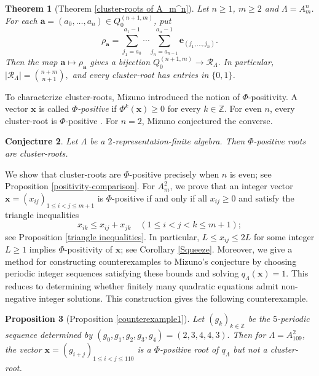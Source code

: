 \documentclass[11pt,a4paper]{amsart}
\newtheorem{theorem}{Theorem}[section]
\newtheorem{proposition}[theorem]{Proposition}
\newtheorem{conjecture}[theorem]{Conjecture}
\theoremstyle{definition}
\numberwithin{equation}{section}
\newcommand{\Z}{\mathbb{Z}}
\newcommand{\e}{\mathbf{e}}
\newcommand{\x}{\mathbf{x}}
\newcommand{\0}{\mathbf{0}}
\begin{document}
	\begin{theorem} [Theorem \ref{cluster-roots of A_m^n}] \label{thm2}
		Let $n\ge1$, $m\ge 2$ and $\Lambda=A_m^n$.
		For each $\mathbf a=(a_0,\ldots,a_n)\in Q_0^{(n+1,m)}$, put
		\[
		\rho_{\mathbf a}
		=
		\sum_{j_1=a_0}^{a_1-1}\cdots
		\sum_{j_n=a_{n-1}}^{a_n-1}
		\e_{(j_1,\ldots,j_n)}.
		\]
		Then the map $\mathbf a\mapsto\rho_{\mathbf a}$ gives a bijection
		$
		Q_0^{(n+1,m)}\rightarrow\mathcal R_\Lambda.
		$
		In particular,
		$
		|\mathcal R_\Lambda|=\binom{n+m}{n+1},
		$
		and every cluster-root has entries in $\{0,1\}$.
	\end{theorem}
	
	To characterize cluster-roots, Mizuno introduced the notion of
	$\Phi$-positivity. 
	A vector $\x$ is called \emph{$\Phi$-positive} if
	$\Phi^k(\x)\ge0$ for every $k\in\Z$.
	For even $n$, every cluster-root is $\Phi$-positive
	\cite[Theorem~5.2]{Miz}.
	For $n=2$, Mizuno conjectured the converse.
	
		\begin{conjecture}  \cite[Conjecture~1.6]{Miz}
		Let $\Lambda$ be a $2$-representation-finite algebra. Then $\Phi$-positive roots are cluster-roots.
	\end{conjecture}
	
	We show that cluster-roots are $\Phi$-positive precisely when $n$ is
	even; see Proposition \ref{positivity-comparison}. 
	For $A_m^2$, we prove that an integer vector
	$\x=(x_{ij})_{1\le i<j\le m+1}$ is $\Phi$-positive if and only if
	all $x_{ij}\ge 0$ and satisfy the triangle inequalities
	\[
	x_{ik}\le x_{ij}+x_{jk}
	\quad(1\le i<j<k\le m+1);
	\] see Proposition \ref{triangle inequalities}. 
	In particular, $L\le x_{ij}\le2L$ for some integer $L\ge1$
	implies $\Phi$-positivity of $\x$; see Corollary \ref{Squeeze}. 
	Moreover, we give a method for constructing counterexamples
	to Mizuno's conjecture by choosing
	periodic integer sequences satisfying these bounds and solving
	$q_\Lambda(\x)=1$.  This reduces to determining whether finitely many quadratic equations
	admit  non-negative integer solutions.  This construction gives the following counterexample. 
	
	
	\begin{proposition}[Proposition \ref{counterexample1}]\label{intro counterexample1}
		Let  $(g_k)_{k\in\mathbb Z}$
		be the $5$-periodic sequence determined by
		$
		(g_0,g_1,g_2,g_3,g_4)=(2,3,4,4,3).
		$ 
		Then for $\Lambda=A_{109}^2$, the vector $\x=(g_{i+j})_{1\le i<j\le110}$
		is a $\Phi$-positive root of $q_\Lambda$
		but not a cluster-root.
	\end{proposition}
	
\end{document}
